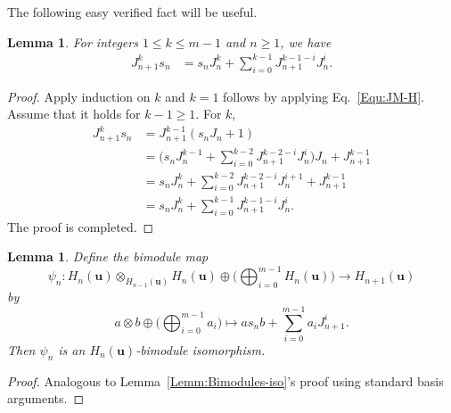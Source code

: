 \documentclass[a4paper, oneside]{amsart}
\numberwithin{equation}{section}
\newtheorem{lemma}[equation]{Lemma}
\theoremstyle{definition}
\theoremstyle{remark}
\begin{document}
 The following easy verified fact will be useful.
\begin{lemma}\label{Lemm:J-s_n}
For integers $1 \leq k\leq m-1$ and $n \geq 1$, we have
\begin{align*}
J_{n+1}^k s_n &= s_n J_n^k + \sum_{i=0}^{k-1} J_{n+1}^{k-1-i} J_n^i.
\end{align*}
\end{lemma}
\begin{proof}Apply induction  on $k$ and $k=1$ follows by applying Eq.~\eqref{Equ:JM-H}. Assume that it holds for $k-1\geq 1$. For $k$,
  \begin{align*}
J_{n+1}^{k} s_n &= J_{n+1}^{k-1}(s_nJ_n+1)\\
&= \biggl(s_n J_n^{k-1} + \sum_{i=0}^{k-2} J_{n+1}^{k-2-i} J_n^i\biggr)J_n+J_{n+1}^{k-1}\\
&=s_nJ_n^{k}+\sum_{i=0}^{k-2} J_{n+1}^{k-2-i} J_n^{i+1}+J_{n+1}^{k-1}\\
&= s_n J_n^k + \sum_{i=0}^{k-1} J_{n+1}^{k-1-i} J_n^i.
\end{align*}
The proof is completed.
\end{proof}
\begin{lemma}\label{Lemm:Bimodules-iso-JM}
Define the bimodule map
\[\psi_n: H_n(\boldsymbol{u}) \otimes_{H_{n-1}(\boldsymbol{u})} H_n(\boldsymbol{u}) \oplus \biggl(\bigoplus_{i=0}^{m-1} H_n(\boldsymbol{u})\biggr) \to H_{n+1}(\boldsymbol{u})\]
by
\[a \otimes b \oplus \biggl(\bigoplus_{i=0}^{m-1} a_i\biggr) \mapsto a s_n b + \sum_{i=0}^{m-1} a_i J_{n+1}^i.\]
Then $\psi_n$ is an $H_n(\boldsymbol{u})$-bimodule isomorphism.
\end{lemma}
\begin{proof}
Analogous to Lemma~\ref{Lemm:Bimodules-iso}'s proof using standard basis arguments.
\end{proof}
\end{document}
